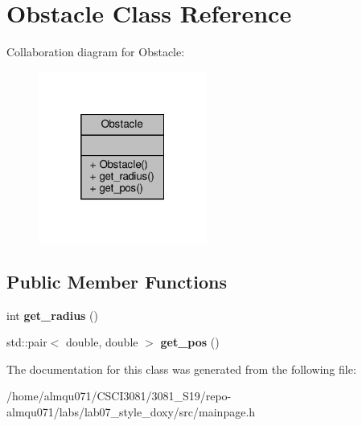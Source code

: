 \hypertarget{classObstacle}{}\section{Obstacle Class Reference}
\label{classObstacle}


Collaboration diagram for Obstacle\+:
\nopagebreak
\begin{figure}[H]
\begin{center}
\leavevmode
\includegraphics[width=157pt]{classObstacle__coll__graph}
\end{center}
\end{figure}
\subsection*{Public Member Functions}
\begin{DoxyCompactItemize}
\item 
\mbox{\label{classObstacle_aa03143fb98cf3fe4f4fb67d1b450b33f}} 
int {\bfseries get\+\_\+radius} ()
\item 
\mbox{\label{classObstacle_a5589725dc457a030f92e73eb632ae205}} 
std\+::pair$<$ double, double $>$ {\bfseries get\+\_\+pos} ()
\end{DoxyCompactItemize}


The documentation for this class was generated from the following file\+:\begin{DoxyCompactItemize}
\item 
/home/almqu071/\+C\+S\+C\+I3081/3081\+\_\+\+S19/repo-\/almqu071/labs/lab07\+\_\+style\+\_\+doxy/src/mainpage.\+h\end{DoxyCompactItemize}
